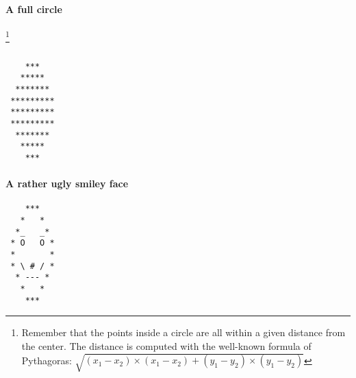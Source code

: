 \documentclass[10pt,a4paper,final]{article}
\begin{document}
\paragraph*{A full circle}\footnote{Remember that the points inside a circle are all within a given distance from the center. The distance is computed with the well-known formula of Pythagoras: $\sqrt{(x_1-x_2) \times (x_1-x_2) + (y_1-y_2) \times (y_1-y_2)}$}

\begin{minipage}[c]{0.95\textwidth}
\begin{lstlisting}

    ***
   *****
  *******
 *********
 *********
 *********
  *******
   *****
    ***
\end{lstlisting}
\end{minipage}

\paragraph*{A rather ugly smiley face}
\begin{minipage}[c]{0.95\textwidth}
\begin{lstlisting}
    ***
   *   *
  *_   _*
 * O   O *
 *       *
 * \ # / *
  * --- *
   *   *
    ***
\end{lstlisting}
\end{minipage}
\end{document}
